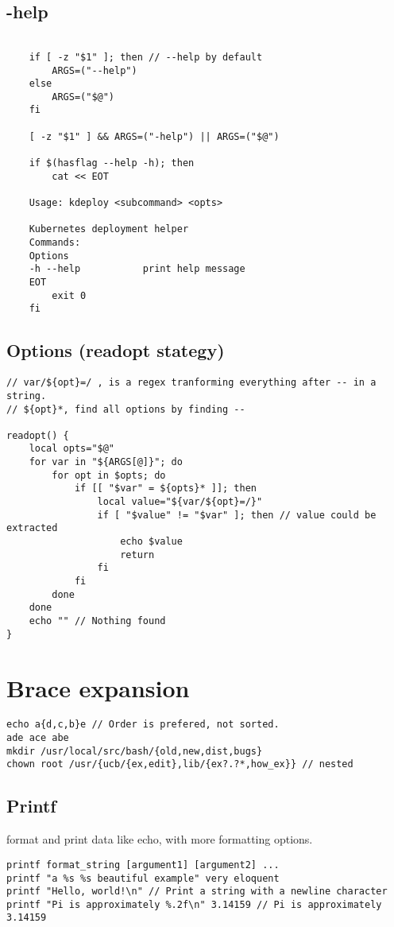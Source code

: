 \subsection{-help}

\begin{verbatim}

    if [ -z "$1" ]; then // --help by default
        ARGS=("--help")
    else
        ARGS=("$@")
    fi

    [ -z "$1" ] && ARGS=("-help") || ARGS=("$@")

    if $(hasflag --help -h); then
        cat << EOT
    
    Usage: kdeploy <subcommand> <opts>
    
    Kubernetes deployment helper
    Commands:
    Options
    -h --help           print help message
    EOT
        exit 0
    fi
\end{verbatim}

\subsection{Options (readopt stategy)}

\begin{verbatim}
// var/${opt}=/ , is a regex tranforming everything after -- in a string. 
// ${opt}*, find all options by finding --

readopt() {
    local opts="$@"
    for var in "${ARGS[@]}"; do
        for opt in $opts; do
            if [[ "$var" = ${opts}* ]]; then
                local value="${var/${opt}=/}"
                if [ "$value" != "$var" ]; then // value could be extracted
                    echo $value
                    return
                fi
            fi
        done
    done
    echo "" // Nothing found
}
\end{verbatim}

\section{Brace expansion}

\begin{verbatim}
echo a{d,c,b}e // Order is prefered, not sorted.
ade ace abe
mkdir /usr/local/src/bash/{old,new,dist,bugs}
chown root /usr/{ucb/{ex,edit},lib/{ex?.?*,how_ex}} // nested
\end{verbatim}

\subsection{Printf}

format and print data like echo, with more formatting options.

\begin{verbatim}
printf format_string [argument1] [argument2] ...
printf "a %s %s beautiful example" very eloquent
printf "Hello, world!\n" // Print a string with a newline character
printf "Pi is approximately %.2f\n" 3.14159 // Pi is approximately 3.14159
\end{verbatim}
